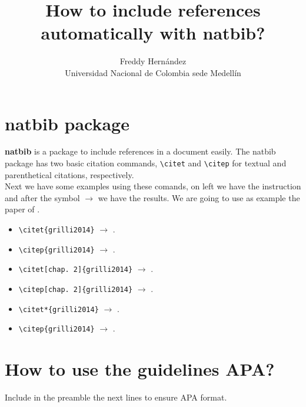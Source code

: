 \documentclass[10pt]{article}
\begin{document}
	
	\title{How to include references automatically with \textbf{natbib}?}
	\author{Freddy Hern\'andez \\ Universidad Nacional de Colombia sede Medell\'in}
	\maketitle
\section{\textbf{natbib} package}
\textbf{natbib} is a package to include references in a document easily. The natbib package has two basic citation commands, \verb|\citet| and \verb|\citep| for textual and parenthetical citations, respectively.\\

Next we have some examples using these comands, on left we have the instruction and after the symbol $\longrightarrow$ we have the results. We are going to use as example the paper of \citet{grilli2014}.

\begin{itemize}
	\item \verb|\citet{grilli2014}| $\longrightarrow$ \citet{grilli2014}. \\
	\item \verb|\citep{grilli2014}| $\longrightarrow$ \citep{grilli2014}. \\
	\item \verb|\citet[chap. 2]{grilli2014}| $\longrightarrow$ \citet[chap. 2]{grilli2014}. \\
	\item \verb|\citep[chap. 2]{grilli2014}| $\longrightarrow$ \citep[chap. 2]{grilli2014}. \\
	\item \verb|\citet*{grilli2014}| $\longrightarrow$ \citet{grilli2014}. \\
	\item \verb|\citep{grilli2014}| $\longrightarrow$ \citep{grilli2014}. \\
\end{itemize}

\section{How to use the guidelines APA?}
Include in the preamble the next lines to ensure APA format.
\end{document}
